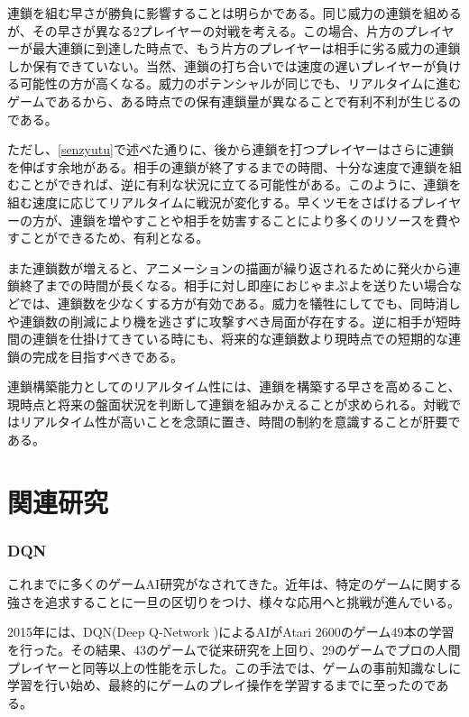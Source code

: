 \documentclass[12pt]{jarticle}
\begin{document}
連鎖を組む早さが勝負に影響することは明らかである。同じ威力の連鎖を組めるが、その早さが異なる2プレイヤーの対戦を考える。この場合、片方のプレイヤーが最大連鎖に到達した時点で、もう片方のプレイヤーは相手に劣る威力の連鎖しか保有できていない。当然、連鎖の打ち合いでは速度の遅いプレイヤーが負ける可能性の方が高くなる。威力のポテンシャルが同じでも、リアルタイムに進むゲームであるから、ある時点での保有連鎖量が異なることで有利不利が生じるのである。

ただし、\ref{senzyutu}で述べた通りに、後から連鎖を打つプレイヤーはさらに連鎖を伸ばす余地がある。相手の連鎖が終了するまでの時間、十分な速度で連鎖を組むことができれば、逆に有利な状況に立てる可能性がある。このように、連鎖を組む速度に応じてリアルタイムに戦況が変化する。早くツモをさばけるプレイヤーの方が、連鎖を増やすことや相手を妨害することにより多くのリソースを費やすことができるため、有利となる。


また連鎖数が増えると、アニメーションの描画が繰り返されるために発火から連鎖終了までの時間が長くなる。相手に対し即座におじゃまぷよを送りたい場合などでは、連鎖数を少なくする方が有効である。威力を犠牲にしてでも、同時消しや連鎖数の削減により機を逃さずに攻撃すべき局面が存在する。逆に相手が短時間の連鎖を仕掛けてきている時にも、将来的な連鎖数より現時点での短期的な連鎖の完成を目指すべきである。

連鎖構築能力としてのリアルタイム性には、連鎖を構築する早さを高めること、現時点と将来の盤面状況を判断して連鎖を組みかえることが求められる。対戦ではリアルタイム性が高いことを念頭に置き、時間の制約を意識することが肝要である。


\part{関連研究} \setcounter{section}{0}
\section{DQN}
これまでに多くのゲームAI研究がなされてきた。近年は、特定のゲームに関する強さを追求することに一旦の区切りをつけ、様々な応用へと挑戦が進んでいる\cite{yan_panorama, adaptive}。

2015年には、DQN(Deep Q-Network )によるAIがAtari 2600のゲーム49本の学習を行った\cite{DQN}。その結果、43のゲームで従来研究を上回り、29のゲームでプロの人間プレイヤーと同等以上の性能を示した。この手法では、ゲームの事前知識なしに学習を行い始め、最終的にゲームのプレイ操作を学習するまでに至ったのである。
\end{document}
